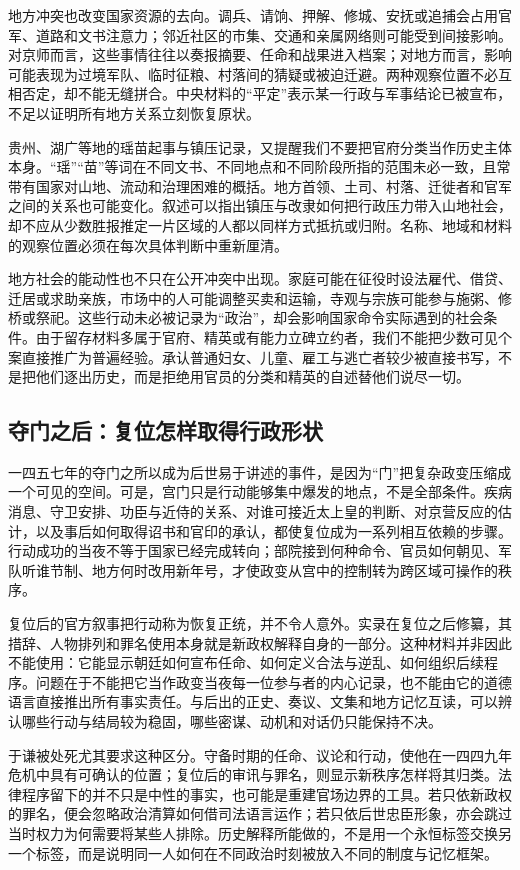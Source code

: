 地方冲突也改变国家资源的去向。调兵、请饷、押解、修城、安抚或追捕会占用官军、道路和文书注意力；邻近社区的市集、交通和亲属网络则可能受到间接影响。对京师而言，这些事情往往以奏报摘要、任命和战果进入档案；对地方而言，影响可能表现为过境军队、临时征粮、村落间的猜疑或被迫迁避。两种观察位置不必互相否定，却不能无缝拼合。中央材料的“平定”表示某一行政与军事结论已被宣布，不足以证明所有地方关系立刻恢复原状。

贵州、湖广等地的瑶苗起事与镇压记录，又提醒我们不要把官府分类当作历史主体本身。“瑶”“苗”等词在不同文书、不同地点和不同阶段所指的范围未必一致，且常带有国家对山地、流动和治理困难的概括。地方首领、土司、村落、迁徙者和官军之间的关系也可能变化。叙述可以指出镇压与改隶如何把行政压力带入山地社会，却不应从少数胜报推定一片区域的人都以同样方式抵抗或归附。名称、地域和材料的观察位置必须在每次具体判断中重新厘清。

地方社会的能动性也不只在公开冲突中出现。家庭可能在征役时设法雇代、借贷、迁居或求助亲族，市场中的人可能调整买卖和运输，寺观与宗族可能参与施粥、修桥或祭祀。这些行动未必被记录为“政治”，却会影响国家命令实际遇到的社会条件。由于留存材料多属于官府、精英或有能力立碑立约者，我们不能把少数可见个案直接推广为普遍经验。承认普通妇女、儿童、雇工与逃亡者较少被直接书写，不是把他们逐出历史，而是拒绝用官员的分类和精英的自述替他们说尽一切。

\subsection{夺门之后：复位怎样取得行政形状}

一四五七年的夺门之所以成为后世易于讲述的事件，是因为“门”把复杂政变压缩成一个可见的空间。可是，宫门只是行动能够集中爆发的地点，不是全部条件。疾病消息、守卫安排、功臣与近侍的关系、对谁可接近太上皇的判断、对京营反应的估计，以及事后如何取得诏书和官印的承认，都使复位成为一系列相互依赖的步骤。行动成功的当夜不等于国家已经完成转向；部院接到何种命令、官员如何朝见、军队听谁节制、地方何时改用新年号，才使政变从宫中的控制转为跨区域可操作的秩序。

复位后的官方叙事把行动称为恢复正统，并不令人意外。实录在复位之后修纂，其措辞、人物排列和罪名使用本身就是新政权解释自身的一部分。这种材料并非因此不能使用：它能显示朝廷如何宣布任命、如何定义合法与逆乱、如何组织后续程序。问题在于不能把它当作政变当夜每一位参与者的内心记录，也不能由它的道德语言直接推出所有事实责任。与后出的正史、奏议、文集和地方记忆互读，可以辨认哪些行动与结局较为稳固，哪些密谋、动机和对话仍只能保持不决。

于谦被处死尤其要求这种区分。守备时期的任命、议论和行动，使他在一四四九年危机中具有可确认的位置；复位后的审讯与罪名，则显示新秩序怎样将其归类。法律程序留下的并不只是中性的事实，也可能是重建官场边界的工具。若只依新政权的罪名，便会忽略政治清算如何借司法语言运作；若只依后世忠臣形象，亦会跳过当时权力为何需要将某些人排除。历史解释所能做的，不是用一个永恒标签交换另一个标签，而是说明同一人如何在不同政治时刻被放入不同的制度与记忆框架。

